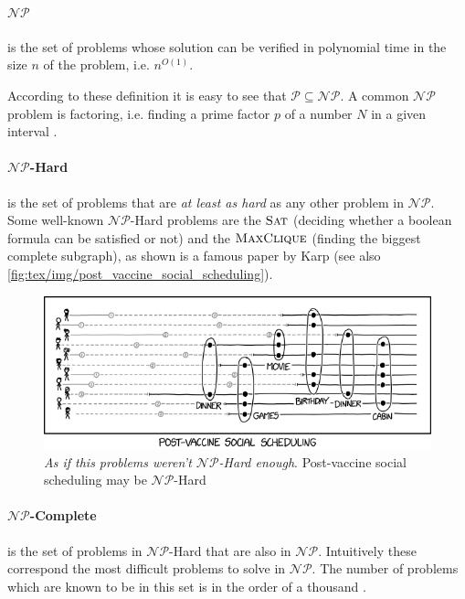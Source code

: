 \paragraph{$\mathcal{NP} $}%
\label{par:np} is the set of problems whose solution can be verified in
polynomial time in the size $n$ of the problem, i.e. $n^{O(1)} $.

According to these definition it is easy to see that $\mathcal{P} \subseteq
	\mathcal{NP} $. A common $\mathcal{NP} $ problem is factoring, i.e. finding a
prime factor $p$ of a number $N$ in a given interval \cite{SanjeevArora2017}.

\paragraph{$\mathcal{NP} $-Hard}%
\label{par:_np_hard} is the set of problems that are \emph{at least as hard} as
any other problem in $\mathcal{NP} $. Some well-known $\mathcal{NP} $-Hard
problems are the $\textsc{Sat}$ (deciding whether a boolean formula can be
satisfied or not) and the $\textsc{MaxClique}$ (finding the biggest complete
subgraph), as shown is a famous paper by Karp \cite{Miller1972} (see also
\autoref{fig:tex/img/post_vaccine_social_scheduling}).

\begin{figure}[]
	\centering
	\includegraphics[width=0.8\linewidth]{tex/img/post_vaccine_social_scheduling.png}
	\caption[$\mathcal{NP}$-Hardness in post-covid times]{\emph{As if this problems weren't $\mathcal{NP} $-Hard enough}.
		Post-vaccine social scheduling may be $\mathcal{NP} $-Hard \cite{Munroe}}%
	\label{fig:tex/img/post_vaccine_social_scheduling}
\end{figure}

\paragraph{$\mathcal{NP} $-Complete}%
\label{par:_np_hard} is the set of problems in $\mathcal{NP} $-Hard that are
also in $\mathcal{NP} $. Intuitively these correspond the most difficult
problems to solve in $\mathcal{NP} $. The number of problems which are known to
be in this set is in the order of a thousand \cite{SanjeevArora2017}.

